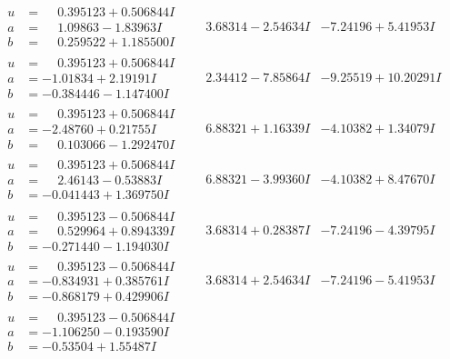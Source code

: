 \documentclass[1p]{elsarticle_modified}
\theoremstyle{definition}
\begin{document}
$$\begin{array}{c|c|c}
\begin{aligned}
u &= \phantom{-}0.395123 + 0.506844 I \\
a &= \phantom{-}1.09863 - 1.83963 I \\
b &= \phantom{-}0.259522 + 1.185500 I\end{aligned}
 & \phantom{-}3.68314 - 2.54634 I & -7.24196 + 5.41953 I \\ \hline\begin{aligned}
u &= \phantom{-}0.395123 + 0.506844 I \\
a &= -1.01834 + 2.19191 I \\
b &= -0.384446 - 1.147400 I\end{aligned}
 & \phantom{-}2.34412 - 7.85864 I & -9.25519 + 10.20291 I \\ \hline\begin{aligned}
u &= \phantom{-}0.395123 + 0.506844 I \\
a &= -2.48760 + 0.21755 I \\
b &= \phantom{-}0.103066 - 1.292470 I\end{aligned}
 & \phantom{-}6.88321 + 1.16339 I & -4.10382 + 1.34079 I \\ \hline\begin{aligned}
u &= \phantom{-}0.395123 + 0.506844 I \\
a &= \phantom{-}2.46143 - 0.53883 I \\
b &= -0.041443 + 1.369750 I\end{aligned}
 & \phantom{-}6.88321 - 3.99360 I & -4.10382 + 8.47670 I \\ \hline\begin{aligned}
u &= \phantom{-}0.395123 - 0.506844 I \\
a &= \phantom{-}0.529964 + 0.894339 I \\
b &= -0.271440 - 1.194030 I\end{aligned}
 & \phantom{-}3.68314 + 0.28387 I & -7.24196 - 4.39795 I \\ \hline\begin{aligned}
u &= \phantom{-}0.395123 - 0.506844 I \\
a &= -0.834931 + 0.385761 I \\
b &= -0.868179 + 0.429906 I\end{aligned}
 & \phantom{-}3.68314 + 2.54634 I & -7.24196 - 5.41953 I \\ \hline\begin{aligned}
u &= \phantom{-}0.395123 - 0.506844 I \\
a &= -1.106250 - 0.193590 I \\
b &= -0.53504 + 1.55487 I\end{aligned}

\end{array}$$
\end{document}
